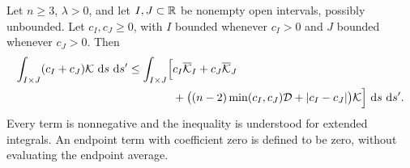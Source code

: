 \begin{lemma}\label{lem:interval-pair}
Let $n\ge3$, $\lambda>0$, and let $I,J\subset\mathbb R$ be nonempty open
intervals, possibly unbounded.  Let $c_I,c_J\ge0$, with $I$ bounded
whenever $c_I>0$ and $J$ bounded whenever $c_J>0$.  Then
\begin{equation}\label{eq:interval-pair}
\begin{split}
 \int_{I\times J}(c_I+c_J)\mathcal K\,\,\mathrm d s\,\,\mathrm d s'
 \le \int_{I\times J}\Bigl[
 &c_I\overline{\mathcal K}_I+c_J\overline{\mathcal K}_J\\
 &+\bigl((n-2)\min(c_I,c_J)\mathcal D
                  +|c_I-c_J|\bigr)\mathcal K\Bigr]\,\,\mathrm d s\,\,\mathrm d s'.
\end{split}
\end{equation}
Every term is nonnegative and the inequality is understood for extended
integrals.  An endpoint term with coefficient zero is defined to be zero,
without evaluating the endpoint average.
\end{lemma}

